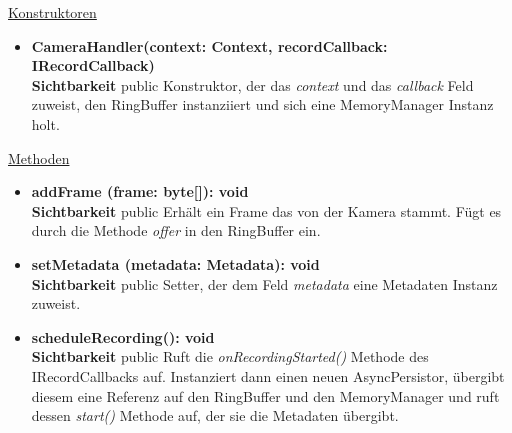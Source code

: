 \underline{Konstruktoren}
\begin{itemize}
\itemsep0pt
\item \textbf{CameraHandler(context: Context, recordCallback: IRecordCallback)} \hfill\\
\textbf{Sichtbarkeit} public\newline
Konstruktor, der das \textit{context} und das \textit{callback} Feld zuweist, den RingBuffer instanziiert und sich eine MemoryManager Instanz holt.
\end{itemize}

\underline{Methoden}
\begin{itemize}
\itemsep0pt
\item \textbf{addFrame (frame: byte[]): void}\hfill\\
\textbf{Sichtbarkeit} public\newline
Erhält ein Frame das von der Kamera stammt. Fügt es durch die Methode \textit{offer} in den RingBuffer ein.

\item \textbf{setMetadata (metadata: Metadata): void}\hfill\\
\textbf{Sichtbarkeit} public\newline
Setter, der dem Feld \textit{metadata} eine Metadaten Instanz zuweist.

\item \textbf{scheduleRecording(): void}\hfill\\
\textbf{Sichtbarkeit} public\newline
Ruft die \textit{onRecordingStarted()} Methode des IRecordCallbacks auf. Instanziert dann einen neuen AsyncPersistor, übergibt diesem eine Referenz auf den RingBuffer und den MemoryManager und ruft dessen \textit{start()} Methode auf, der sie die Metadaten übergibt.

\end{itemize}